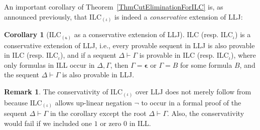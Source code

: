 \documentclass[a4paper]{article}
\theoremstyle{definition}
\newtheorem{remark}[definition]{Remark}
\theoremstyle{theorem}
\newtheorem{corollary}[definition]{Corollary}
\theoremstyle{remark}
\begin{document}
An important corollary of Theorem~\ref{ThmCutEliminationForILC} is, as announced previously, that \textsf{ILC$_{(\iota)}$} is indeed a \emph{conservative} extension of \textsf{LLJ}:
\begin{corollary}[\textsf{ILC$_{\boldsymbol{(\iota)}}$} as a conservative extension of \textsf{LLJ}]
\label{ILCAsConservativeExtensionOfLLJ}
\textsf{ILC} (resp. \textsf{ILC$_\iota$}) is a conservative extension of \textsf{LLJ}, i.e., every provable sequent in \textsf{LLJ} is also provable in \textsf{ILC} (resp. \textsf{ILC$_\iota$}), and if a sequent $\Delta \vdash \Gamma$ is provable in \textsf{ILC} (resp. \textsf{ILC$_\iota$}), where only formulas in ILL occur in $\Delta, \Gamma$, then $\Gamma = \boldsymbol{\epsilon}$ or $\Gamma = B$ for some formula $B$, and the sequent $\Delta \vdash \Gamma$ is also provable in \textsf{LLJ}.
\end{corollary}
\begin{remark}
The conservativity of \textsf{ILC}$_{(\iota)}$ over \textsf{LLJ} does not merely follow from \cite[Proposition~3.8]{schellinx1991some} because \textsf{ILC}$_{(\iota)}$ allows up-linear negation $\neg$ to occur in a formal proof of the sequent $\Delta \vdash \Gamma$ in the corollary except the root $\Delta \vdash \Gamma$.
Also, the conservativity would fail if we included one $1$ or zero $0$ in ILL.
\end{remark}
\end{document}

